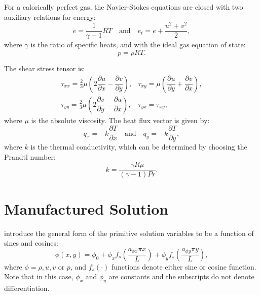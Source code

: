 \documentclass[10pt]{article}
\newcommand{\diff}[2] {\dfrac{\partial #1}{\partial #2}}
\begin{document}
\begin{landscape}
For a calorically perfect gas, the Navier-Stokes equations are closed with two auxiliary relations for energy:
\begin{equation}
 \label{eq:ns2d_05}
e=\dfrac{1}{\gamma -1}RT  \quad \mbox{and} \quad e_t= e+\dfrac{u^2+v^2}{2},
\end{equation}
where $\gamma$ is the ratio of specific heats, and with the ideal gas equation of state:
\begin{equation}
 \label{eq:ns2d_07}
p=\rho RT.
\end{equation}

The shear stress tensor is:
\begin{equation}
 \begin{array}{lll}
  \tau_{xx}= \frac{2}{3}  \mu \left( 2 \diff{u}{x} - \diff{v}{y}\right), &
   \tau_{xy}= \mu \left( \diff{u}{y} + \diff{v}{x}\right), \\
 \tau_{yy}= \frac{2}{3}  \mu \left( 2 \diff{v}{y} - \diff{u}{x}\right), &
 \tau_{yx}= \tau_{xy},
 \end{array}
\end{equation}
where $\mu$ is the absolute viscosity. The heat flux vector is given by:
\begin{equation}
 q_x = - k \diff{T}{x} \quad \mbox{and}\quad q_y = - k \diff{T}{y},
 \end{equation}
where $k$ is the thermal conductivity, which can be determined by choosing the Prandtl number:
$$k= \dfrac{\gamma R \mu}{ (\gamma-1) Pr}.$$



 

\section{Manufactured Solution}

\citet{Roy2002} introduce the general form of the primitive solution variables to be  a function of sines and cosines:
\begin{equation}
 \label{eq:manufactured01}
  \phi (x,y) = \phi_0+ \phi_x f_s(\frac{a_{\phi x} \pi x}{L}) +  \phi_y f_s(\frac{a_{\phi y} \pi y}{L}),
\end{equation}
where $\phi=\rho,u,v$ or $p$, and $f_s(\cdot)$ functions denote either sine or cosine function. Note that in this case, $\phi_x$ and $\phi_y$ are constants  and the subscripts do not denote differentiation.


\end{landscape}
\end{document}
